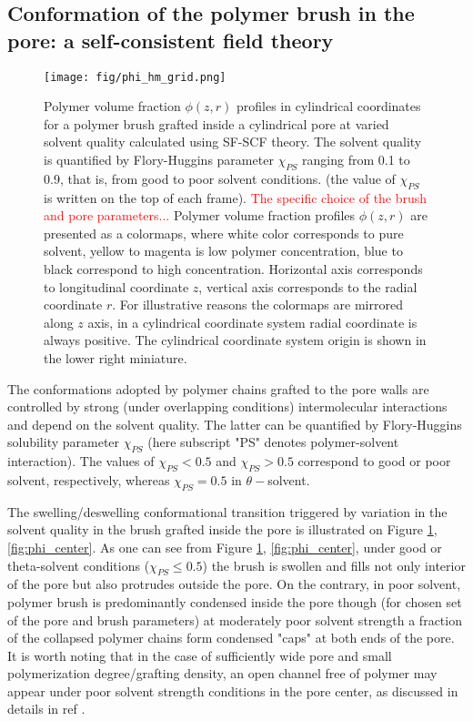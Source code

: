\documentclass[12pt, a4paper]{article}
\newcommand\todo[1]{\textcolor{red}{#1}}
\begin{document}
\subsection{Conformation of the polymer brush in the pore: a self-consistent field theory }




\begin{figure}
    \centering
    \texttt{[image: fig/phi\_hm\_grid.png]}
    \caption{
    Polymer volume fraction $\phi(z,r)$ profiles in cylindrical coordinates for a polymer brush grafted inside a cylindrical pore at varied solvent quality calculated using SF-SCF theory. 
    The solvent quality is quantified  by Flory-Huggins parameter $\chi_{PS}$ ranging from 0.1 to 0.9, that is, from good to poor solvent conditions.
    (the value of $\chi_{PS}$ is written on the top of each frame).
    \todo{The specific choice of the brush and pore parameters...}
    Polymer volume fraction profiles $\phi(z,r)$ are presented as a colormaps,
    where white color corresponds to pure solvent, yellow to magenta is low polymer concentration, blue to black correspond to high concentration.
    Horizontal axis corresponds to longitudinal coordinate $z$, vertical axis corresponds to the radial coordinate $r$.
    For illustrative reasons the colormaps are mirrored along $z$ axis, in a cylindrical coordinate system radial coordinate is always positive.
    The cylindrical coordinate system origin is shown in the lower right miniature.
    }
    \label{fig:phi_hm_grid}
\end{figure}

The conformations adopted by polymer chains grafted to the pore walls are controlled by strong (under overlapping conditions) intermolecular interactions and depend on the solvent quality. 
The latter can be quantified by Flory-Huggins solubility parameter $\chi_{PS}$ (here subscript "PS" denotes polymer-solvent interaction). 
The values of $\chi_{PS}<0.5$ and $\chi_{PS}>0.5$ correspond to good or poor solvent, respectively, whereas $\chi_{PS}=0.5$ in $\theta-$solvent.


The swelling/deswelling conformational transition triggered by variation in the solvent quality in the brush grafted inside the pore is illustrated on Figure \ref{fig:phi_hm_grid}, \ref{fig:phi_center}.
As one can see from Figure \ref{fig:phi_hm_grid}, \ref{fig:phi_center},
under good or theta-solvent conditions ($\chi_{PS}\leq 0.5$) the brush is swollen and fills not only interior of the pore but also protrudes outside the pore. 
On the contrary, in poor solvent, polymer brush is predominantly condensed inside the pore though (for chosen set of the pore and brush parameters) at moderately poor solvent strength
a fraction of the collapsed polymer chains form condensed "caps" at both ends of the pore.
It is worth noting that in the case of sufficiently wide pore and small polymerization degree/grafting density, an open channel free of polymer 
may appear under poor solvent strength conditions in the pore center, as discussed in details in ref \cite{Laktionov_Polymers}.
\end{document}
